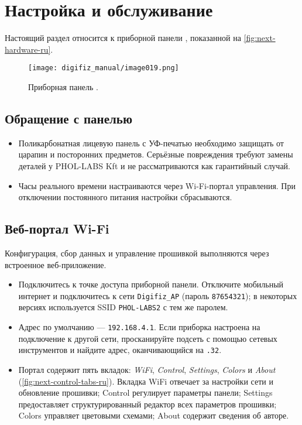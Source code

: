 \chapter{Настройка и обслуживание \ReplicaNextLong{}}\label{ch:replica-next-setup-ru}

Настоящий раздел относится к приборной панели \ReplicaNextLong{}, показанной на \autoref{fig:next-hardware-ru}.

\begin{figure}[htbp]
    \centering
    \texttt{[image: digifiz\_manual/image019.png]}
    \caption{Приборная панель \ReplicaNextLong{}.}
    \label{fig:next-hardware-ru}
\end{figure}

\section{Обращение с панелью}
\begin{itemize}
    \item Поликарбонатная лицевую панель с УФ-печатью необходимо защищать от царапин и посторонних предметов. Серьёзные повреждения требуют замены деталей у PHOL-LABS Kft и не рассматриваются как гарантийный случай.
    \item Часы реального времени настраиваются через Wi-Fi-портал управления. При отключении постоянного питания настройки сбрасываются.
\end{itemize}

\section{Веб-портал Wi-Fi}
Конфигурация, сбор данных и управление прошивкой выполняются через встроенное веб-приложение.
\begin{itemize}
    \item Подключитесь к точке доступа приборной панели. Отключите мобильный интернет и подключитесь к сети \texttt{Digifiz\_AP} (пароль \texttt{87654321}); в некоторых версиях используется SSID \texttt{PHOL-LABS2} с тем же паролем.
    \item Адрес по умолчанию — \texttt{192.168.4.1}. Если приборка настроена на подключение к другой сети, просканируйте подсеть с помощью сетевых инструментов и найдите адрес, оканчивающийся на \texttt{.32}.
    \item Портал содержит пять вкладок: \emph{WiFi}, \emph{Control}, \emph{Settings}, \emph{Colors} и \emph{About} (\autoref{fig:next-control-tabs-ru}). Вкладка WiFi отвечает за настройки сети и обновление прошивки; Control регулирует параметры панели; Settings предоставляет структурированный редактор всех параметров прошивки; Colors управляет цветовыми схемами; About содержит сведения об авторе.
\end{itemize}

